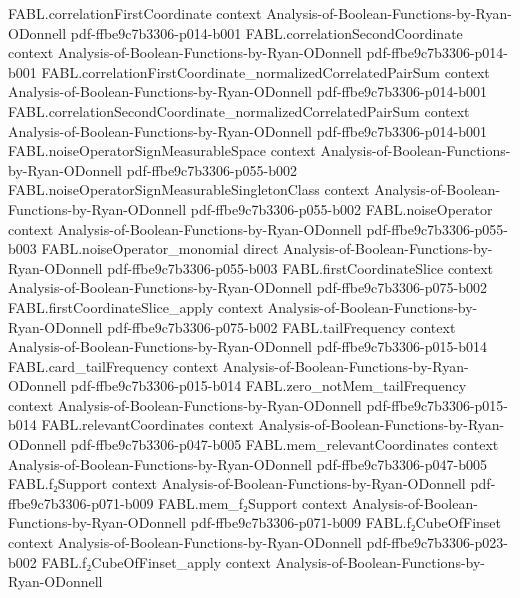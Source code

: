 \begin{theorem}
\proofstep
  {FABL.correlationFirstCoordinate}
  {context}
  {Analysis-of-Boolean-Functions-by-Ryan-ODonnell}
  {pdf-ffbe9c7b3306-p014-b001}
\proofstep
  {FABL.correlationSecondCoordinate}
  {context}
  {Analysis-of-Boolean-Functions-by-Ryan-ODonnell}
  {pdf-ffbe9c7b3306-p014-b001}
\proofstep
  {FABL.correlationFirstCoordinate_normalizedCorrelatedPairSum}
  {context}
  {Analysis-of-Boolean-Functions-by-Ryan-ODonnell}
  {pdf-ffbe9c7b3306-p014-b001}
\proofstep
  {FABL.correlationSecondCoordinate_normalizedCorrelatedPairSum}
  {context}
  {Analysis-of-Boolean-Functions-by-Ryan-ODonnell}
  {pdf-ffbe9c7b3306-p014-b001}
\proofstep
  {FABL.noiseOperatorSignMeasurableSpace}
  {context}
  {Analysis-of-Boolean-Functions-by-Ryan-ODonnell}
  {pdf-ffbe9c7b3306-p055-b002}
\proofstep
  {FABL.noiseOperatorSignMeasurableSingletonClass}
  {context}
  {Analysis-of-Boolean-Functions-by-Ryan-ODonnell}
  {pdf-ffbe9c7b3306-p055-b002}
\proofstep
  {FABL.noiseOperator}
  {context}
  {Analysis-of-Boolean-Functions-by-Ryan-ODonnell}
  {pdf-ffbe9c7b3306-p055-b003}
\proofstep
  {FABL.noiseOperator_monomial}
  {direct}
  {Analysis-of-Boolean-Functions-by-Ryan-ODonnell}
  {pdf-ffbe9c7b3306-p055-b003}
\proofstep
  {FABL.firstCoordinateSlice}
  {context}
  {Analysis-of-Boolean-Functions-by-Ryan-ODonnell}
  {pdf-ffbe9c7b3306-p075-b002}
\proofstep
  {FABL.firstCoordinateSlice_apply}
  {context}
  {Analysis-of-Boolean-Functions-by-Ryan-ODonnell}
  {pdf-ffbe9c7b3306-p075-b002}
\proofstep
  {FABL.tailFrequency}
  {context}
  {Analysis-of-Boolean-Functions-by-Ryan-ODonnell}
  {pdf-ffbe9c7b3306-p015-b014}
\proofstep
  {FABL.card_tailFrequency}
  {context}
  {Analysis-of-Boolean-Functions-by-Ryan-ODonnell}
  {pdf-ffbe9c7b3306-p015-b014}
\proofstep
  {FABL.zero_notMem_tailFrequency}
  {context}
  {Analysis-of-Boolean-Functions-by-Ryan-ODonnell}
  {pdf-ffbe9c7b3306-p015-b014}
\proofstep
  {FABL.relevantCoordinates}
  {context}
  {Analysis-of-Boolean-Functions-by-Ryan-ODonnell}
  {pdf-ffbe9c7b3306-p047-b005}
\proofstep
  {FABL.mem_relevantCoordinates}
  {context}
  {Analysis-of-Boolean-Functions-by-Ryan-ODonnell}
  {pdf-ffbe9c7b3306-p047-b005}
\proofstep
  {FABL.f₂Support}
  {context}
  {Analysis-of-Boolean-Functions-by-Ryan-ODonnell}
  {pdf-ffbe9c7b3306-p071-b009}
\proofstep
  {FABL.mem_f₂Support}
  {context}
  {Analysis-of-Boolean-Functions-by-Ryan-ODonnell}
  {pdf-ffbe9c7b3306-p071-b009}
\proofstep
  {FABL.f₂CubeOfFinset}
  {context}
  {Analysis-of-Boolean-Functions-by-Ryan-ODonnell}
  {pdf-ffbe9c7b3306-p023-b002}
\proofstep
  {FABL.f₂CubeOfFinset_apply}
  {context}
  {Analysis-of-Boolean-Functions-by-Ryan-ODonnell}

\end{theorem}

